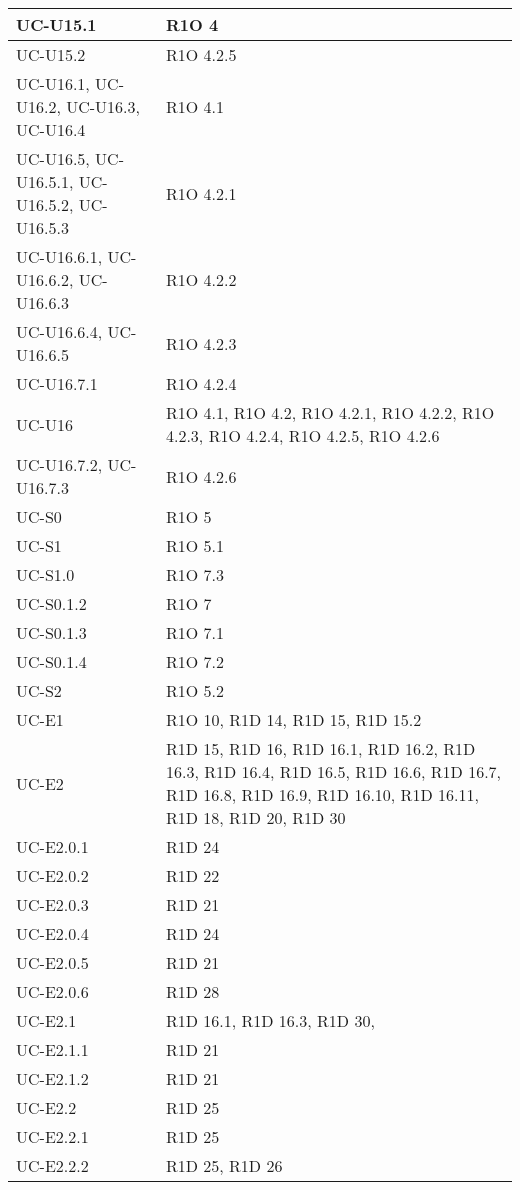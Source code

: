 \begin{center}
\begin{longtable}{ |  p{5cm} | p{5cm} |}
    UC-U15.1 & R1O 4  \\ \hline
    UC-U15.2 & R1O 4.2.5  \\ \hline
    UC-U16.1, UC-U16.2, UC-U16.3, UC-U16.4 & R1O 4.1  \\ \hline
    UC-U16.5, UC-U16.5.1, UC-U16.5.2, UC-U16.5.3 & R1O 4.2.1  \\ \hline
    UC-U16.6.1, UC-U16.6.2, UC-U16.6.3 & R1O 4.2.2  \\ \hline
    UC-U16.6.4, UC-U16.6.5 & R1O 4.2.3  \\ \hline
    UC-U16.7.1 & R1O 4.2.4  \\ \hline
    UC-U16 & R1O 4.1, R1O 4.2, R1O 4.2.1, R1O 4.2.2, R1O 4.2.3, R1O 4.2.4, R1O 4.2.5, R1O 4.2.6   \\ \hline
    UC-U16.7.2, UC-U16.7.3 & R1O 4.2.6  \\ \hline
    UC-S0 & R1O 5  \\ \hline
    UC-S1 & R1O 5.1  \\ \hline
    UC-S1.0 & R1O 7.3  \\ \hline
    UC-S0.1.2 & R1O 7  \\ \hline
    UC-S0.1.3 & R1O 7.1  \\ \hline
    UC-S0.1.4 & R1O 7.2  \\ \hline
    UC-S2 & R1O 5.2  \\ \hline
    UC-E1 & R1O 10, R1D 14, R1D 15, R1D 15.2  \\ \hline
    UC-E2 & R1D 15, R1D 16, R1D 16.1, R1D 16.2, R1D 16.3, R1D 16.4, R1D 16.5, R1D 16.6, R1D 16.7, R1D 16.8, R1D 16.9, R1D 16.10, R1D 16.11, R1D 18, R1D 20, R1D 30  \\ \hline
    UC-E2.0.1 & R1D 24 \\ \hline
    UC-E2.0.2 & R1D 22  \\ \hline
    UC-E2.0.3 & R1D 21  \\ \hline
    UC-E2.0.4 & R1D 24  \\ \hline
    UC-E2.0.5 & R1D 21  \\ \hline
    UC-E2.0.6 & R1D 28  \\ \hline
    UC-E2.1 & R1D 16.1, R1D 16.3, R1D 30,   \\ \hline
    UC-E2.1.1 & R1D 21  \\ \hline
    UC-E2.1.2 & R1D 21  \\ \hline
    UC-E2.2 & R1D 25  \\ \hline
    UC-E2.2.1 & R1D 25 \\ \hline
    UC-E2.2.2 & R1D 25, R1D 26 \\ \hline

\end{longtable}
\end{center}
